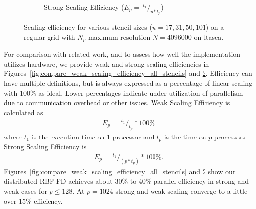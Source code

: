 \documentclass{report}
\begin{document}
\begin{figure}
\begin{subfigure}{0.48\textwidth}
\caption{Strong Scaling Efficiency ($E_p = \ ^{t_{1}}/_{p*t_p} $)}
\label{fig:compare_strong_scaling_efficiency_all_stencils}
\end{subfigure}
\caption{Scaling efficiency for various stencil sizes ($n=17, 31, 50, 101$) on a regular grid with $N_p$ maximum resolution $N=4096000$ on Itasca. } 
\end{figure}


For comparison with related work, and to assess how well the implementation utilizes hardware, we provide weak and strong scaling efficiencies in Figures~\ref{fig:compare_weak_scaling_efficiency_all_stencils} and \ref{fig:compare_strong_scaling_efficiency_all_stencils}. Efficiency can have multiple definitions, but is always expressed as a percentage of linear scaling with 100\% as ideal. Lower percentages indicate under-utilization of parallelism due to communication overhead or other issues.  Weak Scaling Efficiency is calculated as 
\begin{align*}
E_p = \ ^{t_1}/_{t_p} * 100\%
\end{align*}
where $t_1$ is the execution time on 1 processor and $t_p$ is the time on $p$ processors.
Strong Scaling Efficiency is 
\begin{align*}
E_p = \ ^{t_{1}}/_{(p*t_p)} * 100\%.
\end{align*}
Figures~\ref{fig:compare_weak_scaling_efficiency_all_stencils} and \ref{fig:compare_strong_scaling_efficiency_all_stencils} show our distributed RBF-FD achieves about 30\% to 40\% parallel efficiency in strong and weak cases for $p \leq 128$. At $p=1024$ strong and weak scaling converge to a little over 15\% efficiency. 
\end{document}
